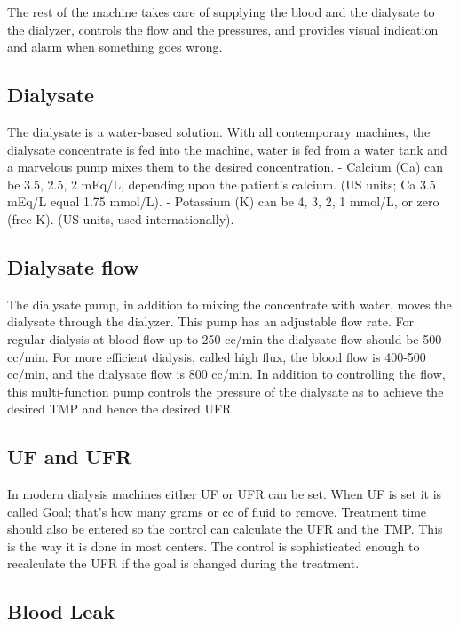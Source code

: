 \documentclass[
  11pt,
  letterpaper,
  DIV=11,
  numbers=noendperiod]{scrreprt}
\begin{document}
The rest of the machine takes care of supplying the blood and the
dialysate to the dialyzer, controls the flow and the pressures, and
provides visual indication and alarm when something goes wrong.

\subsection{Dialysate}\label{dialysate}

The dialysate is a water-based solution. With all contemporary machines,
the dialysate concentrate is fed into the machine, water is fed from a
water tank and a marvelous pump mixes them to the desired concentration.
- Calcium (Ca) can be 3.5, 2.5, 2 mEq/L, depending upon the patient's
calcium. (US units; Ca 3.5 mEq/L equal 1.75 mmol/L). - Potassium (K) can
be 4, 3, 2, 1 mmol/L, or zero (free-K). (US units, used
internationally).

\subsection{Dialysate flow}\label{dialysate-flow}

The dialysate pump, in addition to mixing the concentrate with water,
moves the dialysate through the dialyzer. This pump has an adjustable
flow rate. For regular dialysis at blood flow up to 250 cc/min the
dialysate flow should be 500 cc/min. For more efficient dialysis, called
high flux, the blood flow is 400-500 cc/min, and the dialysate flow is
800 cc/min. In addition to controlling the flow, this multi-function
pump controls the pressure of the dialysate as to achieve the desired
TMP and hence the desired UFR.

\subsection{UF and UFR}\label{uf-and-ufr}

In modern dialysis machines either UF or UFR can be set. When UF is set
it is called Goal; that's how many grams or cc of fluid to remove.
Treatment time should also be entered so the control can calculate the
UFR and the TMP. This is the way it is done in most centers. The control
is sophisticated enough to recalculate the UFR if the goal is changed
during the treatment.

\subsection{Blood Leak}\label{blood-leak}
\end{document}

